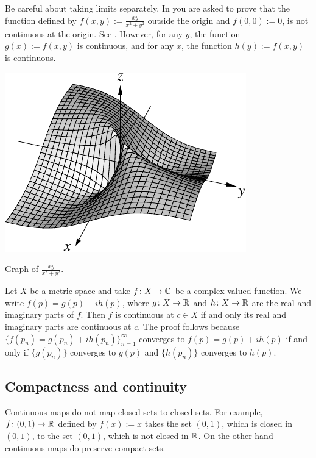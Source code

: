 Be careful about taking limits separately.  In 
you are asked to prove that the function defined by $f(x,y) := \frac{xy}{x^2+y^2}$
outside the origin and $f(0,0) := 0$, is not continuous at the origin.  See
.
However, for any $y$, the function $g(x) := f(x,y)$ is
continuous,
and for any $x$, the function $h(y) := f(x,y)$ is continuous.
\begin{myfigureht}
\includegraphics{figures/xyxsqysq}
\caption{Graph of $\frac{xy}{x^2+y^2}$.\label{fig:xyxsqysq}}
\end{myfigureht}

\begin{example}
Let $X$ be a metric space and take $f \colon X \to {\mathbb{C}}$ be a complex-valued
function.  We write $f(p) = g(p) + i h(p)$, where $g \colon X \to {\mathbb{R}}$
and $h \colon X \to {\mathbb{R}}$ are the real and imaginary parts of $f$.
Then $f$ is continuous at $c \in X$ if and only its real
and imaginary parts are continuous at $c$.  
The proof follows because $\{ f(p_n) = g(p_n) + i h(p_n) \}_{n=1}^\infty$
converges to $f(p) = g(p) + i h(p)$ if and only if
$\{ g(p_n) \}$ converges to $g(p)$ and
$\{ h(p_n) \}$ converges to $h(p)$.
\end{example}

\subsection{Compactness and continuity}

Continuous maps do not map closed sets to closed sets.  For example,
$f \colon (0,1) \to {\mathbb{R}}$ defined by $f(x) := x$ takes the set $(0,1)$, which
is closed in $(0,1)$, to the set $(0,1)$, which is not closed in ${\mathbb{R}}$.
On the other hand continuous maps do preserve compact sets.

